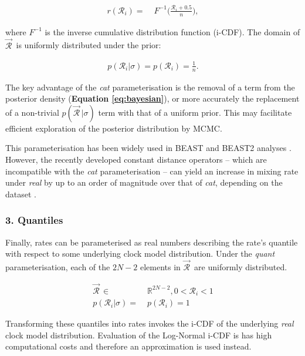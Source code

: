 \documentclass[10pt,letterpaper]{article}
\begin{document}
\begin{align}
r(\mathcal{R}_i) =& \; F^{-1}\big(\frac{\mathcal{R}_i + 0.5}{n}\big),
\end{align}

where $F^{-1}$ is the inverse cumulative distribution function (i-CDF).
The domain of $\vec{\mathcal{R}}^{\,}$ is uniformly distributed under the prior:


\begin{align}
p(\mathcal{R}_i | \sigma) = p(\mathcal{R}_i) = \frac{1}{n}.
\end{align}



The key advantage of the \textit{cat} parameterisation is the removal of a term from the posterior density (\textbf{Equation \ref{eq:bayesian}}), or more accurately the replacement of a non-trivial $p(\vec{\mathcal{R}}^{\,} | \sigma)$ term with that of a uniform prior. 
This may facilitate efficient exploration of the posterior distribution by MCMC.




This parameterisation has been widely used in BEAST and BEAST2 analyses \cite{drummond2006relaxed}. 
However, the recently developed constant distance operators  -- which are incompatible with the \textit{cat} parameterisation -- can yield an increase in mixing rate under \textit{real} by up to an order of magnitude over that of \textit{cat}, depending on the dataset \cite{zhang2020improving}. 






\subsubsection*{3. Quantiles}


Finally, rates can be parameterised as real numbers describing the rate's quantile with respect to some underlying clock model distribution. Under the  \textit{quant} parameterisation, each of the $2N-2$ elements in $\vec{\mathcal{R}}^{\,}$ are uniformly distributed.


\begin{align}
\vec{\mathcal{R}}^{\,} \in & \; \mathbb{R}^{2N-2}, 0 < \mathcal{R}_i < 1  \\
p(\mathcal{R}_i | \sigma) = & \; p(\mathcal{R}_i) = 1
\end{align}


Transforming these quantiles into rates invokes the i-CDF of the underlying \textit{real} clock model distribution.
Evaluation of the Log-Normal i-CDF is has high computational costs and
therefore an approximation is used instead.
\end{document}
